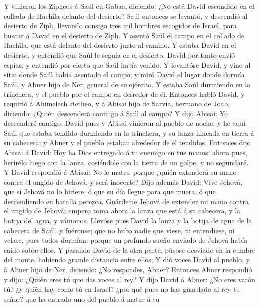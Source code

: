  Y vinieron los Zipheos á Saúl en Gabaa, diciendo: ¿No
está David escondido en el collado de Hachîla delante del desierto?
 Saúl entonces se levantó, y descendió al desierto de
Ziph, llevando consigo tres mil hombres escogidos de Israel, para buscar
á David en el desierto de Ziph.  Y asentó Saúl el campo en
el collado de Hachîla, que está delante del desierto junto al camino. Y
estaba David en el desierto, y entendió que Saúl le seguía en el
desierto.  David por tanto envió espías, y entendió por
cierto que Saúl había venido.  Y levantóse David, y vino
al sitio donde Saúl había asentado el campo; y miró David el lugar donde
dormía Saúl, y Abner hijo de Ner, general de su ejército. Y estaba Saúl
durmiendo en la trinchera, y el pueblo por el campo en derredor de él.
 Entonces habló David, y requirió á Ahimelech Hetheo, y á
Abisai hijo de Sarvia, hermano de Joab, diciendo: ¿Quién descenderá
conmigo á Saúl al campo? Y dijo Abisai: Yo descenderé contigo.
 David pues y Abisai vinieron al pueblo de noche: y he
aquí Saúl que estaba tendido durmiendo en la trinchera, y su lanza
hincada en tierra á su cabecera; y Abner y el pueblo estaban alrededor
de él tendidos.  Entonces dijo Abisai á David: Hoy ha Dios
entregado á tu enemigo en tus manos: ahora pues, herirélo luego con la
lanza, cosiéndole con la tierra de un golpe, y no segundaré.
 Y David respondió á Abisai: No le mates: porque ¿quién
extenderá su mano contra el ungido de Jehová, y será inocente?
 Dijo además David: Vive Jehová, que si Jehová no lo
hiriere, ó que su día llegue para que muera, ó que descendiendo en
batalla perezca,  Guárdeme Jehová de extender mi mano
contra el ungido de Jehová; empero toma ahora la lanza que está á su
cabecera, y la botija del agua, y vámonos.  Llevóse pues
David la lanza y la botija de agua de la cabecera de Saúl, y fuéronse;
que no hubo nadie que viese, ni entendiese, ni velase, pues todos
dormían: porque un profundo sueño enviado de Jehová había caído sobre
ellos.  Y pasando David de la otra parte, púsose desviado
en la cumbre del monte, habiendo grande distancia entre ellos;
 Y dió voces David al pueblo, y á Abner hijo de Ner,
diciendo: ¿No respondes, Abner? Entonces Abner respondió y dijo: ¿Quién
eres tú que das voces al rey?  Y dijo David á Abner: ¿No
eres varón tú? ¿y quién hay como tú en Israel? ¿por qué pues no has
guardado al rey tu señor? que ha entrado uno del pueblo á matar á tu
